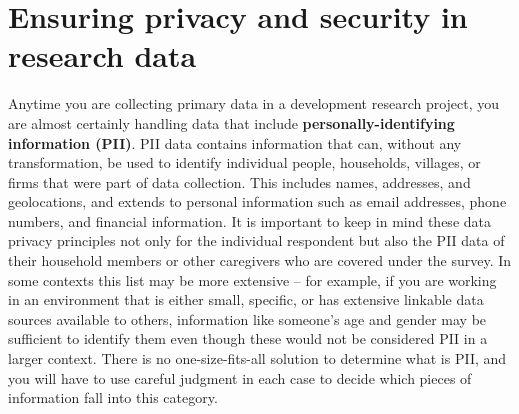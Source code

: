 
\section{Ensuring privacy and security in research data}

Anytime you are collecting primary data in a development research project,
you are almost certainly handling data that include \textbf{personally-identifying
	information (PII)}.
PII data contains information that can, without any transformation, be used to identify
individual people, households, villages, or firms that were part of data collection.
This includes names, addresses, and geolocations, and extends to personal information
such as email addresses, phone numbers, and financial information.
It is important to keep in mind these data privacy principles not only for the individual respondent but also the PII data of their household members or other caregivers who are covered under the survey.
In some contexts this list may be more extensive --
for example, if you are working in an environment that is either small, specific,
or has extensive linkable data sources available to others,
information like someone's age and gender may be sufficient to identify them
even though these would not be considered PII in a larger context.
There is no one-size-fits-all solution to determine what is PII, and you will have to use careful judgment in each case
to decide which pieces of information fall into this category.

